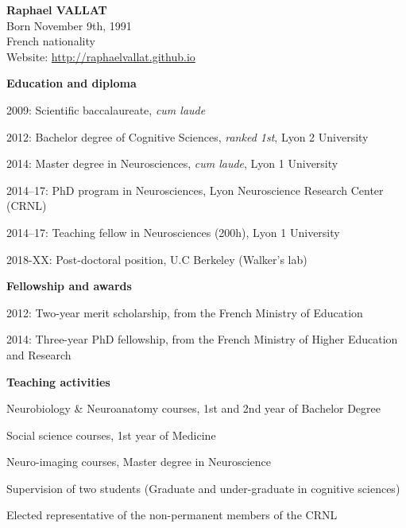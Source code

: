 \label{sec:cv}
\vspace*{-10mm}

\textbf{Raphael VALLAT} \\
Born November 9th, 1991 \\
French nationality \\
Website: \url{http://raphaelvallat.github.io}

\textbf{Education and diploma}

2009: Scientific baccalaureate, \textit{cum laude}

2012: Bachelor degree of Cognitive Sciences, \textit{ranked 1st}, Lyon 2 University

2014: Master degree in Neurosciences, \textit{cum laude}, Lyon 1 University

2014–17: PhD program in Neurosciences, Lyon Neuroscience Research Center (CRNL)

2014–17: Teaching fellow in Neurosciences (200h), Lyon 1 University

2018-XX: Post-doctoral position, U.C Berkeley (Walker's lab)

\textbf{Fellowship and awards}

2012: Two-year merit scholarship, from the French Ministry of Education

2014: Three-year PhD fellowship, from the French Ministry of Higher Education and Research

\textbf{Teaching activities}

Neurobiology \& Neuroanatomy courses, 1st and 2nd year of Bachelor Degree

Social science courses, 1st year of Medicine

Neuro-imaging courses, Master degree in Neuroscience

Supervision of two students (Graduate and under-graduate in cognitive sciences)

Elected representative of the non-permanent members of the CRNL
